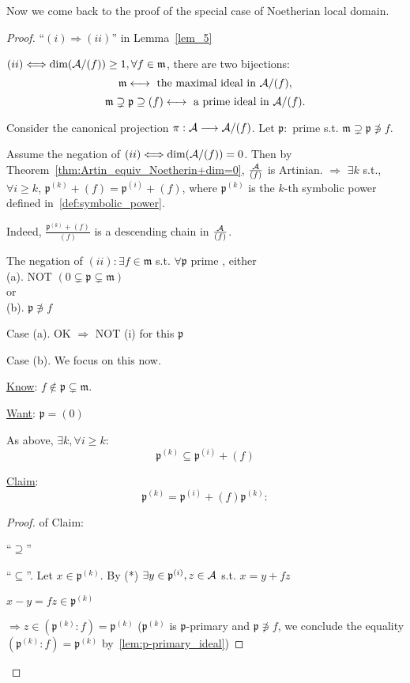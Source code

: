 \documentclass[11pt]{article}
\newcommand{\scm}{{\mathfrak m}}
\newcommand{\scp}{{\mathfrak p}}
\newcommand{\cala}{{\cal A}}
\newcommand{\Lrta}{\Longrightarrow}
\newcommand{\lrta}{\longrightarrow}
\newcommand{\llrta}{\longleftrightarrow}
\newcommand{\Llrta}{\Longleftrightarrow}
\begin{document}
Now we come back to the proof of the special case of Noetherian local domain.
\begin{proof}
``$(i)\Lrta(ii)$'' in Lemma~\ref{lem_5}

$(ii)\Llrta \text{dim}(\cala/(f))\geq 1, \forall f\in\scm$, there are two bijections: 
$$
\scm\llrta \text{ the maximal ideal in }\cala/(f),
$$
$$
\scm\supsetneq\scp\supseteq(f)\llrta\text{ a prime ideal in }\cala/(f).
$$

Consider the canonical projection $\pi:\cala\lrta \cala/(f)$. Let $\scp:$ prime s.t. $\scm\supsetneq \scp\not \ni f$.

Assume the negation of $(ii)\Llrta \text{dim}(\cala/(f))=0$. Then by Theorem~\ref{thm:Artin_equiv_Noetherin+dim=0},
$\frac{\cala}{(f)}$ is  Artinian.  $\Lrta$ $\exists k$ s.t., $\forall i\geq k$, $\scp^{(k)}+(f)=\scp^{(i)}+(f)$, where $\scp^{(k)}$ is the $k$-th symbolic power defined in~\ref{def:symbolic_power}.

Indeed, $\frac{\scp^{(k)}+(f)}{(f)}$ is a descending chain in $\frac{\cala}{(f)}$.

The negation of $(ii):\exists f\in \scm$ s.t. $\forall \scp$ prime , either\\
(a). NOT $(0\subsetneq \scp\subsetneq\scm)$\\
or\\
(b). $\scp\not\ni f$

Case (a). OK $\Lrta $ NOT (i) for this $\scp$

Case (b). We focus on this now.

\underline{Know}: $f\notin \scp\subsetneq \scm$.

\underline{Want}: $\scp=(0)$

As above, $\exists k,\forall i\geq k$: 
\begin{equation}\tag{*}
\scp^{(k)}\subseteq\scp^{(i)}+(f)
\end{equation}

\underline{Claim}:
\begin{equation}\tag{**}
\scp^{(k)}=\scp^{(i)}+(f)\scp^{(k)}:
\end{equation}
\begin{proof} of Claim:

``$\supseteq$'' \checkmark

``$\subseteq$''. Let $x\in\scp^{(k)}$. By (*) $\exists y\in\scp^{(i)},z\in\cala$ s.t. $x=y+fz$

$x-y=fz\in \scp^{(k)}$

$\Lrta z\in(\scp^{(k)}:f)=\scp^{(k)}$ ($\scp^{(k)}$ is $\scp$-primary and $\scp\not\ni f$, we conclude the equality $(\scp^{(k)}:f)=\scp^{(k)}$ by~\ref{lem:p-primary_ideal})


\end{proof}
\end{proof}
\end{document}
